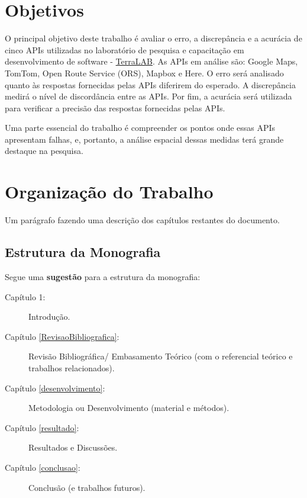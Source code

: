 \section{Objetivos}

O principal objetivo deste trabalho é avaliar o erro, a discrepância e a acurácia de cinco APIs utilizadas no laboratório de pesquisa e capacitação em desenvolvimento de software - \href{http://www2.decom.ufop.br/terralab/}{TerraLAB}. As APIs em análise são: Google Maps, TomTom, Open Route Service (ORS), Mapbox e Here. O erro será analisado quanto às respostas fornecidas pelas APIs diferirem do esperado. A discrepância medirá o nível de discordância entre as APIs. Por fim, a acurácia será utilizada para verificar a precisão das respostas fornecidas pelas APIs.

Uma parte essencial do trabalho é compreender os pontos onde essas APIs apresentam falhas, e, portanto, a análise espacial dessas medidas terá grande destaque na pesquisa.

\section{Organização do Trabalho}

Um parágrafo fazendo uma descrição dos capítulos restantes do documento. 

\subsection{Estrutura da Monografia}

Segue uma \textbf{sugestão} para a estrutura da monografia: 

\begin{description}
   \item[Capítulo 1:] Introdução.
   \item[Capítulo \ref{RevisaoBibliografica}:] Revisão Bibliográfica/ Embasamento Teórico (com o referencial teórico e trabalhos relacionados).
   \item[Capítulo \ref{desenvolvimento}:] Metodologia ou Desenvolvimento (material e métodos).
   \item[Capítulo \ref{resultado}:] Resultados e Discussões.
   \item[Capítulo \ref{conclusao}:] Conclusão (e trabalhos futuros).
\end{description}


 









